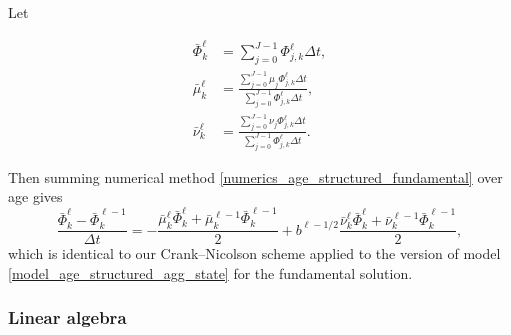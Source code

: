 \documentclass{jpmarticle}
\let\subequationsorig\subequations%
\let\endsubequationsorig\endsubequations%
\renewenvironment{subequations}{
  \subequationsorig
  \renewcommand{\theequation}{\theparentequation.\arabic{equation}}
}{
  \endsubequationsorig
}
\begin{document}
Let
\begin{subequations}
  \begin{align}
    \bar{\Phi}_k^{\ell}
    &= \sum_{j = 0}^{J - 1} \Phi_{j, k}^{\ell} \Delta t,
    \\
    \bar{\mu}_k^{\ell}
    &= \frac{\sum_{j = 0}^{J - 1} \mu_j \Phi_{j, k}^{\ell} \Delta t}
    {\sum_{j = 0}^{J - 1} \Phi_{j, k}^{\ell} \Delta t},
    \\
    \bar{\nu}_k^{\ell}
    &= \frac{\sum_{j = 0}^{J - 1} \nu_j \Phi_{j, k}^{\ell} \Delta t}
    {\sum_{j = 0}^{J - 1} \Phi_{j, k}^{\ell} \Delta t}.
  \end{align}
\end{subequations}
Then summing numerical method
\eqref{numerics_age_structured_fundamental} over age gives
\begin{equation}
  \frac{\bar{\Phi}_k^{\ell} - \bar{\Phi}_k^{\ell - 1}}{\Delta t}
  = - \frac{\bar{\mu}_k^{\ell} \bar{\Phi}_k^{\ell}
    + \bar{\mu}_k^{\ell - 1} \bar{\Phi}_k^{\ell - 1}}{2}
  + b^{\ell - 1 / 2}
  \frac{\bar{\nu}_k^{\ell} \bar{\Phi}_k^{\ell}
    + \bar{\nu}_k^{\ell - 1} \bar{\Phi}_k^{\ell - 1}}{2},
\end{equation}
which is identical to our Crank--Nicolson scheme applied to the
version of model \eqref{model_age_structured_agg_state} for the
fundamental solution.


\subsubsection{Linear algebra}
\end{document}
